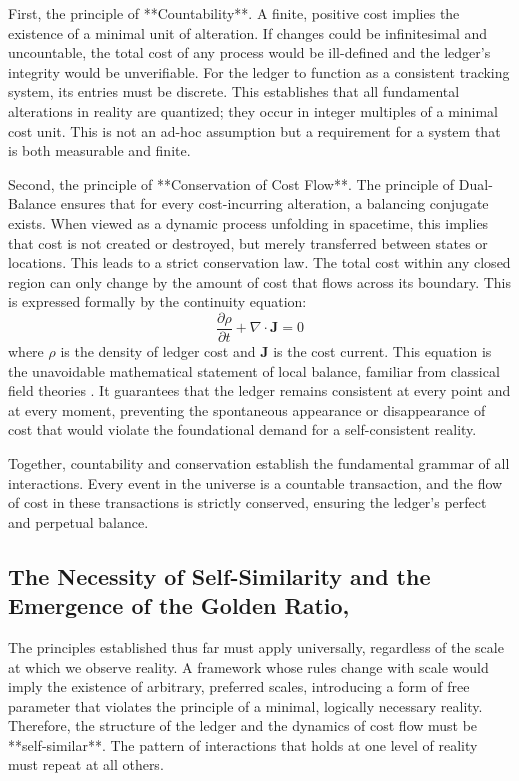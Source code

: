 First, the principle of **Countability**. A finite, positive cost implies the existence of a minimal unit of alteration. If changes could be infinitesimal and uncountable, the total cost of any process would be ill-defined and the ledger's integrity would be unverifiable. For the ledger to function as a consistent tracking system, its entries must be discrete. This establishes that all fundamental alterations in reality are quantized; they occur in integer multiples of a minimal cost unit. This is not an ad-hoc assumption but a requirement for a system that is both measurable and finite.

Second, the principle of **Conservation of Cost Flow**. The principle of Dual-Balance ensures that for every cost-incurring alteration, a balancing conjugate exists. When viewed as a dynamic process unfolding in spacetime, this implies that cost is not created or destroyed, but merely transferred between states or locations. This leads to a strict conservation law. The total cost within any closed region can only change by the amount of cost that flows across its boundary. This is expressed formally by the continuity equation:
\begin{equation}
\frac{\partial\rho}{\partial t} + \nabla \cdot \mathbf{J} = 0
\end{equation}
where \(\rho\) is the density of ledger cost and \(\mathbf{J}\) is the cost current. This equation is the unavoidable mathematical statement of local balance, familiar from classical field theories \parencite{Jackson1999}. It guarantees that the ledger remains consistent at every point and at every moment, preventing the spontaneous appearance or disappearance of cost that would violate the foundational demand for a self-consistent reality.

Together, countability and conservation establish the fundamental grammar of all interactions. Every event in the universe is a countable transaction, and the flow of cost in these transactions is strictly conserved, ensuring the ledger's perfect and perpetual balance.

\subsection{The Necessity of Self-Similarity and the Emergence of the Golden Ratio, }
The principles established thus far must apply universally, regardless of the scale at which we observe reality. A framework whose rules change with scale would imply the existence of arbitrary, preferred scales, introducing a form of free parameter that violates the principle of a minimal, logically necessary reality. Therefore, the structure of the ledger and the dynamics of cost flow must be **self-similar**. The pattern of interactions that holds at one level of reality must repeat at all others.

